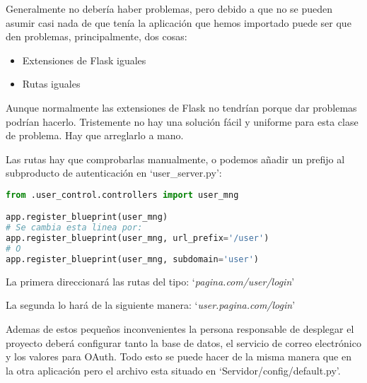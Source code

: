 Generalmente no debería haber problemas, pero debido a que no se pueden asumir casi nada de que tenía la aplicación que hemos importado puede ser que den problemas, principalmente, dos cosas:

\begin{itemize}
\setlength{\itemsep}{1pt}
\setlength{\parskip}{0pt}
\setlength{\parsep}{0pt}
\item Extensiones de Flask iguales
\item Rutas iguales
\end{itemize}

Aunque normalmente las extensiones de Flask no tendrían porque dar problemas podrían hacerlo. Tristemente no hay una solución fácil y uniforme para esta clase de problema. Hay que arreglarlo a mano.

Las rutas hay que comprobarlas manualmente, o podemos añadir un prefijo al subproducto de autenticación en `user\_server.py':


\lstset{style=blockstyle}
\begin{lstlisting}[language=Python]
from .user_control.controllers import user_mng

app.register_blueprint(user_mng)
# Se cambia esta linea por:
app.register_blueprint(user_mng, url_prefix='/user')
# O
app.register_blueprint(user_mng, subdomain='user')
\end{lstlisting}

La primera direccionará las rutas del tipo: `\textit{pagina.com/user/login}'

La segunda lo hará de la siguiente manera: `\textit{user.pagina.com/login}'

Ademas de estos pequeños inconvenientes la persona responsable de desplegar el proyecto deberá configurar tanto la base de datos, el servicio de correo electrónico y los valores para OAuth. Todo esto se puede hacer de la misma manera que en la otra aplicación pero el archivo esta situado en `Servidor/config/default.py'.




